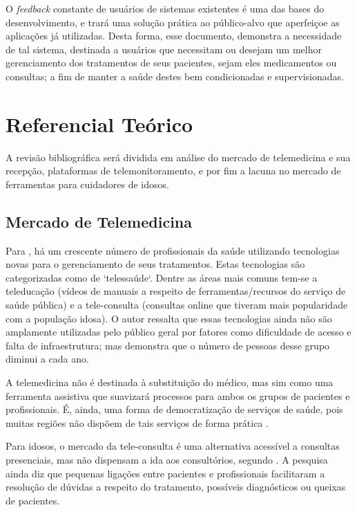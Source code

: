 \documentclass[
	article,			%
	12pt,				%
	oneside,			%
	a4paper,			%
    BIBLATEX,           %
	english,			%
	brazil,				%
	sumario=tradicional
	]{abntex2}
\begin{document}
O \textit{feedback} constante de usuários de sistemas existentes é uma das bases do desenvolvimento, e trará uma solução prática ao público-alvo que aperfeiçoe as aplicações já utilizadas. Desta forma, esse documento, demonstra a necessidade de tal sistema, destinada a usuários que necessitam ou desejam um melhor gerenciamento dos tratamentos de seus pacientes, sejam eles medicamentos ou consultas; a fim de manter a saúde destes bem condicionadas e supervisionadas.

\section{Referencial Teórico}

A revisão bibliográfica será dividida em análise do mercado de telemedicina e sua recepção, plataformas de telemonitoramento, e por fim a lacuna no mercado de ferramentas para cuidadores de idosos.

\subsection{Mercado de Telemedicina}

Para , há um crescente número de profissionais da saúde utilizando tecnologias novas para o gerenciamento de seus tratamentos. Estas tecnologias são categorizadas como de `telessaúde`. Dentre as áreas mais comuns tem-se a teleducação (vídeos de manuais a respeito de ferramentas/recursos do serviço de saúde pública) e a tele-consulta (consultas online que tiveram mais popularidade com a população idosa). O autor ressalta que essas tecnologias ainda não são amplamente utilizadas pelo público geral por fatores como dificuldade de acesso e falta de infraestrutura; mas demonstra que o número de pessoas desse grupo diminui a cada ano.

A telemedicina não é destinada à substituição do médico, mas sim como uma ferramenta assistiva que suavizará processos para ambos os grupos de pacientes e profissionais. É, ainda, 
uma forma de democratização de serviços de saúde, pois muitas regiões não dispõem de tais serviços de forma prática \cite{Schaefer2023telemedicina}.

Para idosos, o mercado da tele-consulta é uma alternativa acessível a consultas presenciais, mas não dispensam a ida aos consultórios, segundo . A pesquisa ainda diz que pequenas ligações entre pacientes e profissionais facilitaram a resolução de dúvidas a respeito do tratamento, possíveis diagnósticos ou queixas de pacientes.
\end{document}
